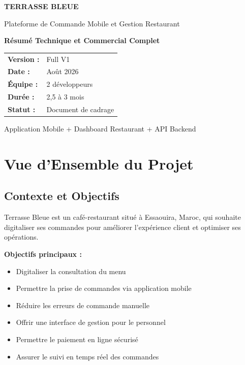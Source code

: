 \documentclass[11pt,a4paper]{article}
\begin{document}
\begin{titlepage}
    \centering
    \vspace*{2cm}
    
    {\Huge\bfseries\color{primaryblue} TERRASSE BLEUE}
    
    \vspace{1cm}
    
    {\Large Plateforme de Commande Mobile et Gestion Restaurant}
    
    \vspace{1.5cm}
    
    {\large\bfseries Résumé Technique et Commercial Complet}
    
    \vspace{2cm}
    
    \begin{tabular}{ll}
        \textbf{Version :} & Full V1 \\
        \textbf{Date :} & Août 2026 \\
        \textbf{Équipe :} & 2 développeurs \\
        \textbf{Durée :} & 2,5 à 3 mois \\
        \textbf{Statut :} & Document de cadrage \\
    \end{tabular}
    
    \vfill
    
    {\large Application Mobile + Dashboard Restaurant + API Backend}
    
\end{titlepage}

\tableofcontents
\newpage

\section{Vue d'Ensemble du Projet}

\subsection{Contexte et Objectifs}

Terrasse Bleue est un café-restaurant situé à Essaouira, Maroc, qui souhaite digitaliser ses commandes pour améliorer l'expérience client et optimiser ses opérations.

\textbf{Objectifs principaux :}
\begin{itemize}
    \item Digitaliser la consultation du menu
    \item Permettre la prise de commandes via application mobile
    \item Réduire les erreurs de commande manuelle
    \item Offrir une interface de gestion pour le personnel
    \item Permettre le paiement en ligne sécurisé
    \item Assurer le suivi en temps réel des commandes
\end{itemize}
\end{document}
